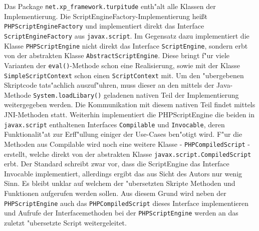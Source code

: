 Das Package \texttt{net.xp\_framework.turpitude} enth"alt alle Klassen der Implementierung. 
Die ScriptEngineFactory-Implementierung hei\ss t \texttt{PHPScriptEngineFactory} und implementiert direkt das Interface 
\texttt{ScriptEngineFactory} aus \texttt{javax.script}. Im Gegensatz dazu implementiert die Klasse \texttt{PHPScriptEngine} nicht
direkt das Interface \texttt{ScriptEngine}, sondern erbt von der abstrakten Klasse \texttt{AbstractScriptEngine}. Diese bringt f"ur
viele Varianten der \texttt{eval()}-Methode schon eine Realisierung, sowie mit der Klasse \texttt{SimpleScriptContext} schon einen 
\texttt{ScriptContext} mit. Um den "ubergebenen Skriptcode tats"achlich auszuf"uhren, muss dieser an den mittels der Java-Methode
\texttt{System.loadLibary()} geladenen nativen Teil der Implementierung weitergegeben werden. Die Kommunikation mit diesem
nativen Teil findet mittels JNI-Methoden statt.
Weiterhin implementiert die PHPScriptEngine die beiden in \texttt{javax.script} enthaltenen Interfaces \texttt{Compilable} und
\texttt{Invocable}, deren Funktionalit"at zur Erff"ullung einiger der Use-Cases ben"otigt wird. F"ur die Methoden aus
Compilable wird noch eine weitere Klasse - \texttt{PHPCompiledScript} - erstellt, welche direkt von der abstrakten
Klasse \texttt{javax.script.CompiledScript} erbt.
Der Standard schreibt zwar vor, dass die ScriptEngine das Interface Invocable implementiert, allerdings ergibt das aus Sicht
des Autors nur wenig Sinn. Es bleibt unklar auf welchem der "ubersetzten Skripte Methoden und Funktionen aufgerufen werden sollen.
Aus diesem Grund wird neben der \texttt{PHPScriptEngine} auch das \texttt{PHPCompiledScript} dieses Interface implementieren
und Aufrufe der Interfacemethoden bei der \texttt{PHPScriptEngine} werden an das zuletzt "ubersetzte Script weitergeleitet.

